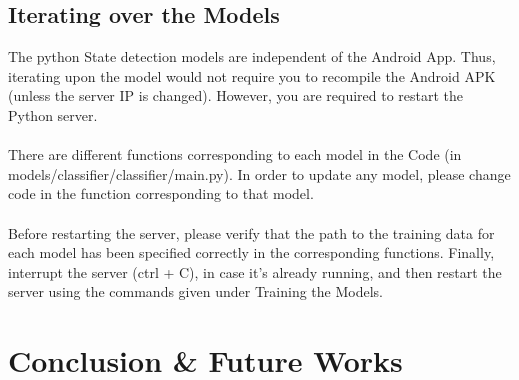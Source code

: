 \documentclass[10pt]{report}
\begin{document}
\section{Iterating over the Models}
The python State detection models are independent of the Android App. Thus, iterating upon the model would not require you to recompile the Android APK (unless the server IP is changed). However, you are required to restart the Python server. \\ \\
There are different functions corresponding to each model in the Code (in
models/classifier/classifier/main.py). In order to update any model, please
change code in the function corresponding to that model. \\ \\
Before restarting the server, please verify that the path to the training data for each model has been specified correctly in the corresponding functions. Finally, interrupt the server (ctrl + C), in case it’s already running, and then restart the server using the commands given under Training the Models.
\chapter{Conclusion \& Future Works}
\end{document}
